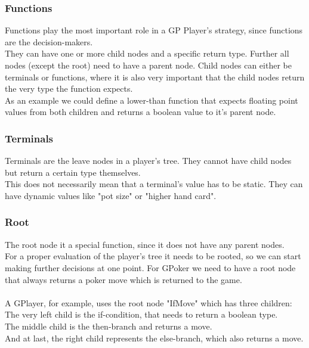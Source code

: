 \documentclass[12pt,fleqn,a4paper]{article}
\begin{document}
\subsubsection{Functions}
Functions play the most important role in a GP Player's strategy, since functions are the decision-makers.\\
They can have one or more child nodes and a specific return type. Further all nodes (except the root)  need to have a parent node.
Child nodes can either be terminals or functions, where it is also very important that the child nodes return the very type the function expects.\\
As an example we could define a lower-than function that expects floating point values from both children and returns a boolean value to it's parent node.

\subsubsection{Terminals}
Terminals are the leave nodes in a player's tree. They cannot have child nodes but return a certain type themselves.\\
This does not necessarily mean that a terminal's value has to be static. They can have dynamic values like "pot size" or "higher hand card".

\subsubsection{Root}
The root node it a special function, since it does not have any parent nodes.\\
For a proper evaluation of the player's tree it needs to be rooted, so we can start making further decisions at one point.
For GPoker we need to have a root node that always returns a poker move which is returned to the game.\\
~\\
A GPlayer, for example, uses the root node "IfMove" which has three children:\\
The very left child is the if-condition, that needs to return a boolean type.\\
The middle child is the then-branch and returns a move.\\
And at last, the right child represents the else-branch, which also returns a move.\\

\newpage
\end{document}
